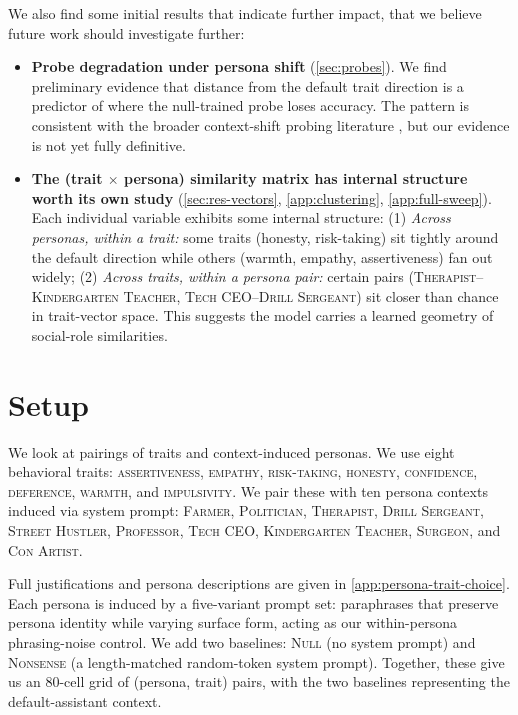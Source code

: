 \documentclass{article}
\theoremstyle{plain}
\theoremstyle{definition}
\theoremstyle{remark}
\begin{document}
We also find some initial results that indicate further impact, that we believe future work should investigate further:
\begin{itemize}
    \item \textbf{Probe degradation under persona shift} (\cref{sec:probes}). We find preliminary evidence that distance from the default trait direction is a predictor of where the null-trained probe loses accuracy. The pattern is consistent with the broader context-shift probing literature \citep{agarwal2025context, hewitt2019designinginterpretingprobescontrol}, but our evidence is not yet fully definitive.
    \item \textbf{The (trait $\times$ persona) similarity matrix has internal structure worth its own study} (\cref{sec:res-vectors}, \cref{app:clustering}, \cref{app:full-sweep}). Each individual variable exhibits some internal structure: (1) \emph{Across personas, within a trait:} some traits (honesty, risk-taking) sit tightly around the default direction while others (warmth, empathy, assertiveness) fan out widely; (2) \emph{Across traits, within a persona pair:} certain pairs (\textsc{Therapist}--\textsc{Kindergarten Teacher}, \textsc{Tech CEO}--\textsc{Drill Sergeant}) sit closer than chance in trait-vector space. This suggests the model carries a learned geometry of social-role similarities.
\end{itemize}
 
\section{Setup}
\label{sec:setup}
 
We look at pairings of traits and context-induced personas. We use eight behavioral traits: \textsc{assertiveness}, \textsc{empathy}, \textsc{risk-taking}, \textsc{honesty}, \textsc{confidence}, \textsc{deference}, \textsc{warmth}, and \textsc{impulsivity}. We pair these with ten persona contexts induced via system prompt: \textsc{Farmer}, \textsc{Politician}, \textsc{Therapist}, \textsc{Drill Sergeant}, \textsc{Street Hustler}, \textsc{Professor}, \textsc{Tech CEO}, \textsc{Kindergarten Teacher}, \textsc{Surgeon}, and \textsc{Con Artist}. 

Full justifications and persona descriptions are given in \cref{app:persona-trait-choice}. Each persona is induced by a five-variant prompt set: paraphrases that preserve persona identity while varying surface form, acting as our within-persona phrasing-noise control. We add two baselines: \textsc{Null} (no system prompt) and \textsc{Nonsense} (a length-matched random-token system prompt). Together, these give us an $80$-cell grid of (persona, trait) pairs, with the two baselines representing the default-assistant context.
 
\end{document}
